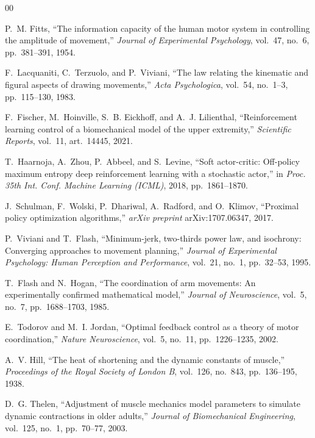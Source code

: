 \documentclass[conference]{IEEEtran}
\begin{document}
\begin{thebibliography}{00}

P.~M. Fitts, ``The information capacity of the human motor system in
controlling the amplitude of movement,'' \emph{Journal of Experimental
Psychology}, vol.~47, no.~6, pp.~381--391, 1954.

F.~Lacquaniti, C.~Terzuolo, and P.~Viviani, ``The law relating the kinematic
and figural aspects of drawing movements,'' \emph{Acta Psychologica}, vol.~54,
no.~1--3, pp.~115--130, 1983.

F.~Fischer, M.~Hoinville, S.~B. Eickhoff, and A.~J. Lilienthal,
``Reinforcement learning control of a biomechanical model of the upper
extremity,'' \emph{Scientific Reports}, vol.~11, art.~14445, 2021.

T.~Haarnoja, A.~Zhou, P.~Abbeel, and S.~Levine, ``Soft actor-critic:
Off-policy maximum entropy deep reinforcement learning with a stochastic
actor,'' in \emph{Proc. 35th Int. Conf. Machine Learning (ICML)}, 2018,
pp.~1861--1870.

J.~Schulman, F.~Wolski, P.~Dhariwal, A.~Radford, and O.~Klimov, ``Proximal
policy optimization algorithms,'' \emph{arXiv preprint} arXiv:1707.06347,
2017.

P.~Viviani and T.~Flash, ``Minimum-jerk, two-thirds power law, and isochrony:
Converging approaches to movement planning,'' \emph{Journal of Experimental
Psychology: Human Perception and Performance}, vol.~21, no.~1, pp.~32--53,
1995.

T.~Flash and N.~Hogan, ``The coordination of arm movements: An experimentally
confirmed mathematical model,'' \emph{Journal of Neuroscience}, vol.~5, no.~7,
pp.~1688--1703, 1985.

E.~Todorov and M.~I. Jordan, ``Optimal feedback control as a theory of motor
coordination,'' \emph{Nature Neuroscience}, vol.~5, no.~11, pp.~1226--1235,
2002.

A.~V. Hill, ``The heat of shortening and the dynamic constants of muscle,''
\emph{Proceedings of the Royal Society of London B}, vol.~126, no.~843,
pp.~136--195, 1938.

D.~G. Thelen, ``Adjustment of muscle mechanics model parameters to simulate
dynamic contractions in older adults,'' \emph{Journal of Biomechanical
Engineering}, vol.~125, no.~1, pp.~70--77, 2003.


\end{thebibliography}
\end{document}
